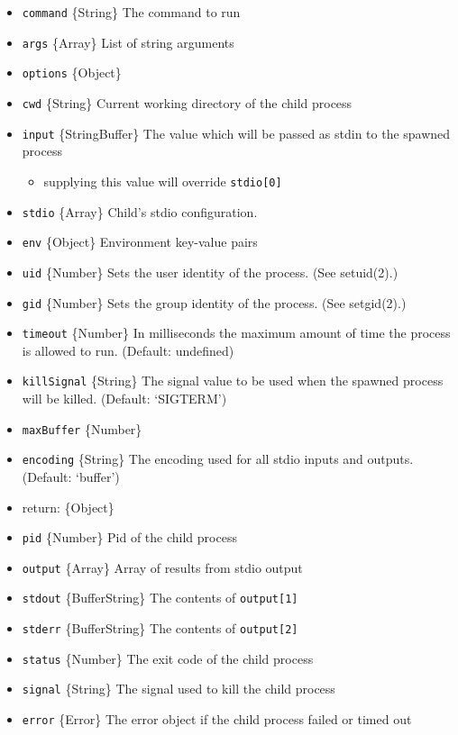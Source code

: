 \begin{itemize}
\itemsep1pt\parskip0pt
\item
  \texttt{command} \{String\} The command to run
\item
  \texttt{args} \{Array\} List of string arguments
\item
  \texttt{options} \{Object\}
\item
  \texttt{cwd} \{String\} Current working directory of the child process
\item
  \texttt{input} \{String\textbar{}Buffer\} The value which will be
  passed as stdin to the spawned process

  \begin{itemize}
  \itemsep1pt\parskip0pt
  \item
    supplying this value will override \texttt{stdio{[}0{]}}
  \end{itemize}
\item
  \texttt{stdio} \{Array\} Child's stdio configuration.
\item
  \texttt{env} \{Object\} Environment key-value pairs
\item
  \texttt{uid} \{Number\} Sets the user identity of the process. (See
  setuid(2).)
\item
  \texttt{gid} \{Number\} Sets the group identity of the process. (See
  setgid(2).)
\item
  \texttt{timeout} \{Number\} In milliseconds the maximum amount of time
  the process is allowed to run. (Default: undefined)
\item
  \texttt{killSignal} \{String\} The signal value to be used when the
  spawned process will be killed. (Default: `SIGTERM')
\item
  \texttt{maxBuffer} \{Number\}
\item
  \texttt{encoding} \{String\} The encoding used for all stdio inputs
  and outputs. (Default: `buffer')
\item
  return: \{Object\}
\item
  \texttt{pid} \{Number\} Pid of the child process
\item
  \texttt{output} \{Array\} Array of results from stdio output
\item
  \texttt{stdout} \{Buffer\textbar{}String\} The contents of
  \texttt{output{[}1{]}}
\item
  \texttt{stderr} \{Buffer\textbar{}String\} The contents of
  \texttt{output{[}2{]}}
\item
  \texttt{status} \{Number\} The exit code of the child process
\item
  \texttt{signal} \{String\} The signal used to kill the child process
\item
  \texttt{error} \{Error\} The error object if the child process failed
  or timed out
\end{itemize}

